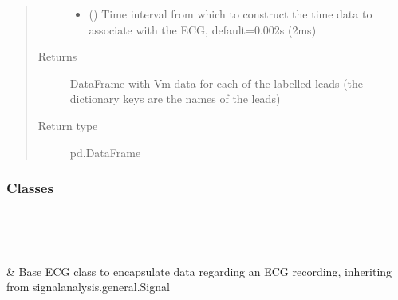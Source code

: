 \documentclass[letterpaper,10pt,english]{sphinxmanual}
\begin{document}
\begin{fulllineitems}
\begin{quote}
\begin{description}
\begin{itemize}
\item {} 
\sphinxAtStartPar
{} (\sphinxstyleliteralemphasis{\sphinxupquote{, }}) \textendash{} Time interval from which to construct the time data to associate with the ECG, default=0.002s (2ms)

\end{itemize}

\item[{Returns}] \leavevmode
\sphinxAtStartPar
{} \textendash{} DataFrame with Vm data for each of the labelled leads (the dictionary keys are the names of the leads)

\item[{Return type}] \leavevmode
\sphinxAtStartPar
pd.DataFrame

\end{description}\end{quote}

\end{fulllineitems}

\subsubsection*{Classes}


\begin{savenotes}\sphinxatlongtablestart\begin{longtable}[c]{}
\hline

\endfirsthead

%
{}\\
\hline

\endhead

\hline
{}\\
\endfoot

\endlastfoot

\sphinxAtStartPar
{\hyperref[\detokenize{_autosummary/signalanalysis.ecg.Ecg:signalanalysis.ecg.Ecg}]{}}
&
\sphinxAtStartPar
Base ECG class to encapsulate data regarding an ECG recording, inheriting from signalanalysis.general.Signal
\\
\hline
\end{longtable}\sphinxatlongtableend\end{savenotes}
\end{document}
